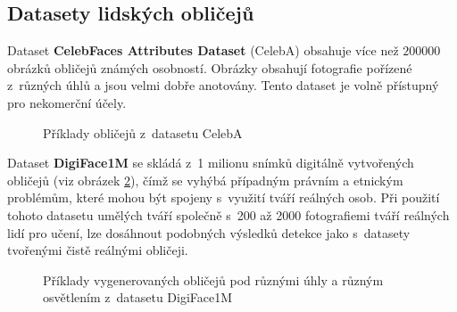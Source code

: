 \subsection*{Datasety lidských obličejů}
Dataset \textbf{CelebFaces Attributes Dataset} (CelebA) \cite{celeba} obsahuje více než $200 000$ obrázků obličejů známých osobností. Obrázky obsahují fotografie pořízené z~různých úhlů a jsou velmi dobře anotovány. Tento dataset je volně přístupný pro nekomerční účely.

\begin{figure}[H]
  \begin{center}
  \label{obrazek:celeba}
  \caption{Příklady obličejů z~datasetu CelebA}
  \end{center}
\end{figure}

Dataset \textbf{DigiFace1M} \cite{digiface1m} se skládá z~1 milionu snímků digitálně vytvořených obličejů (viz obrázek \ref{obrazek:digiface}), čímž se vyhýbá případným právním a etnickým problémům, které mohou být spojeny s~využití tváří reálných osob. Při použití tohoto datasetu umělých tváří společně s~200 až 2000 fotografiemi tváří reálných lidí pro učení, lze dosáhnout podobných výsledků detekce jako s~datasety tvořenými čistě reálnými obličeji.

\begin{figure}[H]
  \begin{center}
  \label{obrazek:digiface}
  \caption{Příklady vygenerovaných obličejů pod různými úhly a různým osvětlením z~datasetu DigiFace1M \cite{digiface1m}}
  \end{center}
\end{figure}

